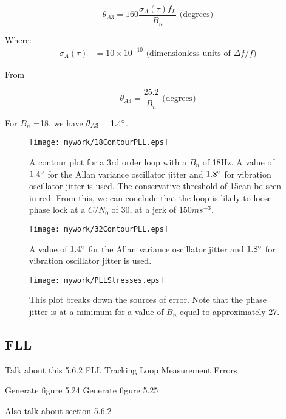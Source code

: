 \begin{equation}
\theta_{A3} = 160 \frac{\sigma_A(\tau)f_L}{B_n} \text{ (degrees)}
\end{equation}

Where:
\begin{align*}
\sigma_A(\tau) &= 10 \times 10^{-10} \text{ (dimensionless units of }\Delta f/f\text{)}
\end{align*}

From \cite{VT803Datasheet}


\begin{equation}
\theta_{A3} =\frac{25.2}{B_n} \text{ (degrees)}
\end{equation}

For $B_n$ =18, we have $\theta_{A3}=1.4\degree$.


\begin{figure}[!htb] 
    \centering
    \texttt{[image: mywork/18ContourPLL.eps]} 
    \caption{A contour plot for a 3rd order loop with a $B_n$ of 18Hz. A value of $1.4\degree$ for the Allan variance oscillator jitter and $1.8\degree$ for vibration oscillator jitter is used. The conservative threshold of 15\degree can be seen in red. From this, we can conclude that the loop is likely to loose phase lock at a $C/N_0$ of 30,  at a jerk of $150ms^{-3}$.}
\end{figure}

\begin{figure}[!htb] 
    \centering
    \texttt{[image: mywork/32ContourPLL.eps]} 
    \caption{A value of $1.4\degree$ for the Allan variance oscillator jitter and $1.8\degree$ for vibration oscillator jitter is used.}
\end{figure}


\begin{figure}[!htb] 
    \centering
    \texttt{[image: mywork/PLLStresses.eps]} 
    \caption{This plot breaks down the sources of error. Note that the phase jitter is at a minimum for a value of $B_n$ equal to approximately 27.}
\end{figure}


\subsection{FLL}


Talk about this
5.6.2 FLL Tracking Loop Measurement Errors

Generate figure 5.24
Generate figure 5.25

Also talk about section 5.6.2

